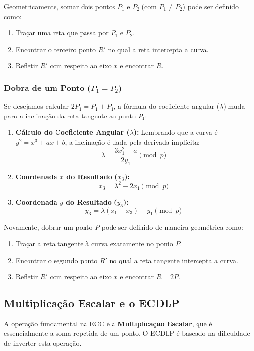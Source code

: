 \documentclass{article}
\theoremstyle{definicao_estilo}
\begin{document}
Geometricamente, somar dois pontos $P_1$ e $P_2$ (com $P_1 \neq P_2$) pode ser definido como: 
\begin{enumerate}
\item Traçar uma reta que passa por $P_1$ e $P_2$.
\item Encontrar o terceiro ponto $R'$ no qual a reta intercepta a curva.
\item Refletir $R'$ com respeito ao eixo $x$ e encontrar $R$.
\end{enumerate}

\subsubsection*{Dobra de um Ponto ($P_1 = P_2$)}
Se desejamos calcular $2P_1 = P_1 + P_1$, a fórmula do coeficiente angular ($\lambda$) muda para a inclinação da reta tangente ao ponto $P_1$:

\begin{enumerate}
\item \textbf{Cálculo do Coeficiente Angular ($\lambda$):}
Lembrando que a curva é $y^2 = x^3 + ax + b$, a inclinação é dada pela derivada implícita:
$$ \lambda = \frac{3x_1^2 + a}{2y_1} \pmod p $$
\item \textbf{Coordenada $x$ do Resultado ($x_3$):}
$$ x_3 = \lambda^2 - 2x_1 \pmod p $$
\item \textbf{Coordenada $y$ do Resultado ($y_3$):}
$$ y_3 = \lambda(x_1 - x_3) - y_1 \pmod p $$
\end{enumerate}

Novamente, dobrar um ponto $P$ pode ser definido de maneira geométrica como:

\begin{enumerate}
\item Traçar a reta tangente à curva exatamente no ponto $P$.
\item Encontrar o segundo ponto $R'$ no qual a reta tangente intercepta a curva.
\item Refletir $R'$ com respeito ao eixo $x$ e encontrar $R = 2P$.
\end{enumerate}

\subsection{Multiplicação Escalar e o ECDLP}

A operação fundamental na ECC é a \textbf{Multiplicação Escalar}, que é essencialmente a soma repetida de um ponto. O ECDLP é baseado na dificuldade de inverter esta operação.
\end{document}

